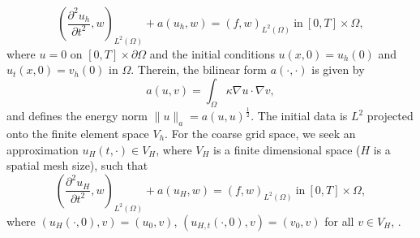 \documentclass[preprint,12pt]{elsarticle}
\begin{document}
\begin{equation}\label{0.2}
    \left(\frac{\partial^2 u_h}{\partial t^2},w\right)_{L^2(\Omega)}+a(u_h,w)=(f,w)_{L^2(\Omega)}~\mathrm{in}~[0,T]\times\Omega,
\end{equation}
where $u=0$ on $[0,T]\times \partial\Omega $ and the initial conditions $u(x,0)=u_h(0)$ and $u_t(x,0)=v_h(0)$ in $\Omega$.
Therein, the bilinear form $a(\cdot,\cdot)$ is given by 
$$a(u,v)=\int_{\Omega}\kappa\nabla u\cdot\nabla v,$$ and defines the energy norm $\|u\|_a=a(u,u)^{\frac{1}{2}}$.
The initial data is $L^2$ projected onto the finite element space $V_h$.
For the coarse grid space, we seek an approximation $u_H(t,\cdot)\in V_H$, where $V_H$ is a finite dimensional space ($H$ is a spatial mesh size), such that
\begin{equation}\label{0.21}
    \left(\frac{\partial^2 u_H}{\partial t^2},w\right)_{L^2(\Omega)}+a(u_H,w)=(f,w)_{L^2(\Omega)}~\mathrm{in}~[0,T]\times\Omega,
\end{equation}
where $(u_H(\cdot,0),v)=(u_0,v)$, $(u_{H,t}(\cdot,0),v)=(v_0,v)$ for all $v\in V_H$, .


  
\end{document}
